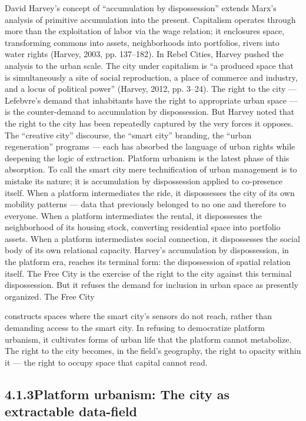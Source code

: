 David Harvey’s concept of “accumulation by dispossession” extends Marx’s analysis of primitive accumulation into the present. Capitalism operates through more than the exploitation of labor via the wage relation; it enclosures space, transforming commons into assets, neighborhoods into portfolios, rivers into water rights (Harvey, 2003, pp. 137–182). In Rebel Cities, Harvey pushed the analysis to the urban scale. The city under capitalism is “a produced space that is simultaneously a site of social reproduction, a place of commerce and industry, and a locus of political power” (Harvey, 2012, pp. 3–24). The right to the city — Lefebvre’s demand that inhabitants have the right to appropriate urban space — is the counter-demand to accumulation by dispossession. But Harvey noted that the right to the city has been repeatedly captured by the very forces it opposes. The “creative city” discourse, the “smart city” branding, the “urban regeneration” programs — each has absorbed the language of urban rights while deepening the logic of extraction. Platform urbanism is the latest phase of this absorption. To call the smart city mere technification of urban management is to mistake its nature; it is accumulation by dispossession applied to co-presence itself. When a platform intermediates the ride, it dispossesses the city of its own mobility patterns — data that previously belonged to no one and therefore to everyone. When a platform intermediates the rental, it dispossesses the neighborhood of its housing stock, converting residential space into portfolio assets. When a platform intermediates social connection, it dispossesses the social body of its own relational capacity. Harvey’s accumulation by dispossession, in the platform era, reaches its terminal form: the dispossession of spatial relation itself. The Free City is the exercise of the right to the city against this terminal dispossession. But it refuses the demand for inclusion in urban space as presently organized. The Free City

constructs spaces where the smart city’s sensors do not reach, rather than demanding access to the smart city. In refusing to democratize platform urbanism, it cultivates forms of urban life that the platform cannot metabolize. The right to the city becomes, in the field’s geography, the right to opacity within it — the right to occupy space that capital cannot read.

\subsection{4.1.3\quad Platform urbanism: The city as extractable data-field}

